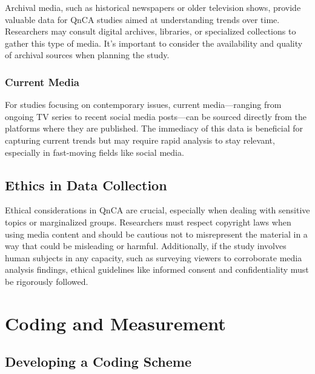 \documentclass[
  b5paper]{book}
\begin{document}
Archival media, such as historical newspapers or older television shows, provide valuable data for QnCA studies aimed at understanding trends over time. Researchers may consult digital archives, libraries, or specialized collections to gather this type of media. It's important to consider the availability and quality of archival sources when planning the study.

\hypertarget{current-media}{%
\subsubsection*{Current Media}\label{current-media}}

For studies focusing on contemporary issues, current media---ranging from ongoing TV series to recent social media posts---can be sourced directly from the platforms where they are published. The immediacy of this data is beneficial for capturing current trends but may require rapid analysis to stay relevant, especially in fast-moving fields like social media.

\hypertarget{ethics-in-data-collection}{%
\subsection*{Ethics in Data Collection}\label{ethics-in-data-collection}}

Ethical considerations in QnCA are crucial, especially when dealing with sensitive topics or marginalized groups. Researchers must respect copyright laws when using media content and should be cautious not to misrepresent the material in a way that could be misleading or harmful. Additionally, if the study involves human subjects in any capacity, such as surveying viewers to corroborate media analysis findings, ethical guidelines like informed consent and confidentiality must be rigorously followed.

\hypertarget{coding-and-measurement}{%
\section{Coding and Measurement}\label{coding-and-measurement}}

\hypertarget{developing-a-coding-scheme}{%
\subsection*{Developing a Coding Scheme}\label{developing-a-coding-scheme}}
\end{document}
